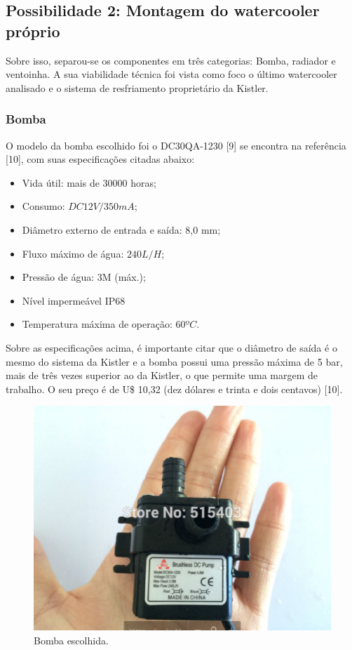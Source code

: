 \subsection{Possibilidade 2: Montagem do watercooler próprio}


Sobre isso, separou-se os componentes em três categorias: Bomba, radiador e ventoinha. A sua viabilidade técnica foi vista como foco o último watercooler analisado e o sistema de resfriamento proprietário da Kistler.

\subsubsection{Bomba}

O modelo da bomba escolhido foi o DC30QA-1230 [9] se encontra na referência [10], com suas especificações citadas abaixo:
\begin{itemize}
\item Vida útil: mais de 30000 horas;
\item Consumo: $DC12V / 350mA$;
\item Diâmetro externo de entrada e saída: 8,0 mm;
\item Fluxo máximo de água: $240L / H$;
\item Pressão de água: 3M (máx.);
\item Nível impermeável IP68
\item Temperatura máxima de operação: $60ºC$.
\end{itemize}

Sobre as especificações acima, é importante citar que o diâmetro de saída é o mesmo do sistema da Kistler e a bomba possui uma pressão máxima de 5 bar, mais de três vezes superior ao da Kistler, o que permite uma margem de trabalho. O seu preço é de U\$ 10,32 (dez dólares e trinta e dois centavos) [10].
 

\begin{figure}[!htb]                                                               
   \centering                                                                      
   \includegraphics[scale=0.4, keepaspectratio=true]{figuras/bomba.eps}
   \caption{Bomba escolhida.}               
\end{figure}


